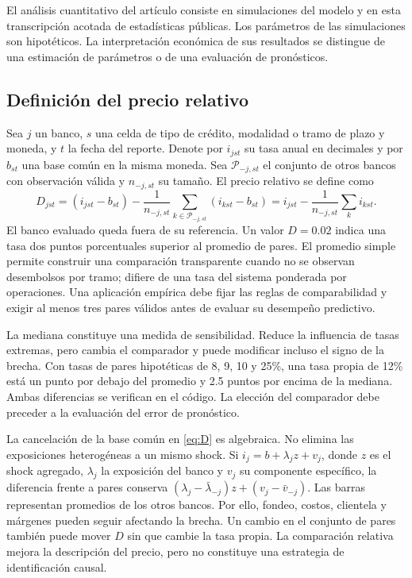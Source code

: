 \documentclass[11pt]{article}
\theoremstyle{definition}\newtheorem{assumption}{Supuesto}
\begin{document}
El análisis cuantitativo del artículo consiste en simulaciones del modelo y
en esta transcripción acotada de estadísticas públicas. Los parámetros de las
simulaciones son hipotéticos. La interpretación económica de sus resultados
se distingue de una estimación de parámetros o de una evaluación de pronósticos.

\subsection{Definición del precio relativo}
Sea $j$ un banco, $s$ una celda de tipo de crédito, modalidad o tramo de plazo
y moneda, y $t$ la fecha del reporte. Denote por $i_{jst}$ su tasa anual en
decimales y por $b_{st}$ una base común en la misma moneda. Sea
$\mathcal P_{-j,st}$ el conjunto de otros bancos con observación válida y
$n_{-j,st}$ su tamaño. El precio relativo se define como
\begin{equation}\label{eq:D}
D_{jst}=(i_{jst}-b_{st})-
\frac{1}{n_{-j,st}}\sum_{k\in\mathcal P_{-j,st}}(i_{kst}-b_{st})
=i_{jst}-\frac{1}{n_{-j,st}}\sum_k i_{kst}.
\end{equation}
El banco evaluado queda fuera de su referencia. Un valor $D=0.02$ indica una
tasa dos puntos porcentuales superior al promedio de pares. El promedio
simple permite construir una comparación transparente cuando no se observan
desembolsos por tramo; difiere de una tasa del sistema ponderada por
operaciones. Una aplicación empírica debe fijar las reglas de comparabilidad
y exigir al menos tres pares válidos antes de evaluar su desempeño predictivo.

La mediana constituye una medida de sensibilidad. Reduce la influencia de
tasas extremas, pero cambia el comparador y puede modificar incluso el signo
de la brecha. Con tasas de pares hipotéticas de 8, 9, 10 y 25\%, una tasa
propia de 12\% está un punto por debajo del promedio y 2.5 puntos por encima
de la mediana. Ambas diferencias se verifican en el código. La elección del
comparador debe preceder a la evaluación del error de pronóstico.

La cancelación de la base común en \eqref{eq:D} es algebraica. No elimina las
exposiciones heterogéneas a un mismo shock. Si $i_j=b+\lambda_j z+v_j$, donde
$z$ es el shock agregado, $\lambda_j$ la exposición del banco y $v_j$ su
componente específico, la diferencia frente a pares conserva
$(\lambda_j-\bar\lambda_{-j})z+(v_j-\bar v_{-j})$. Las barras representan
promedios de los otros bancos. Por ello, fondeo, costos, clientela y márgenes
pueden seguir afectando la brecha. Un cambio en el conjunto de pares también
puede mover $D$ sin que cambie la tasa propia. La comparación relativa mejora
la descripción del precio, pero no constituye una estrategia de identificación
causal.
\end{document}
